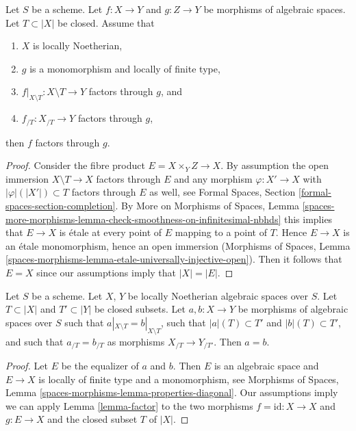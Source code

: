 \begin{lemma}
\label{lemma-factor}
Let $S$ be a scheme. Let $f : X \to Y$ and $g : Z \to Y$ be morphisms
of algebraic spaces. Let $T \subset |X|$ be closed.
Assume that
\begin{enumerate}
\item $X$ is locally Noetherian,
\item $g$ is a monomorphism and locally of finite type,
\item $f|_{X \setminus T} : X \setminus T \to Y$ factors through $g$, and
\item $f_{/T} : X_{/T} \to Y$ factors through $g$,
\end{enumerate}
then $f$ factors through $g$.
\end{lemma}

\begin{proof}
Consider the fibre product $E = X \times_Y Z \to X$.
By assumption the open immersion $X \setminus T \to X$
factors through $E$ and any morphism $\varphi : X' \to X$ with
$|\varphi|(|X'|) \subset T$ factors through $E$ as well, see
Formal Spaces, Section \ref{formal-spaces-section-completion}.
By More on Morphisms of Spaces, Lemma
\ref{spaces-more-morphisms-lemma-check-smoothness-on-infinitesimal-nbhds}
this implies that $E \to X$ is \'etale at every point of $E$
mapping to a point of $T$. Hence $E \to X$ is an \'etale
monomorphism, hence an open immersion
(Morphisms of Spaces, Lemma
\ref{spaces-morphisms-lemma-etale-universally-injective-open}).
Then it follows that $E = X$ since our assumptions imply that $|X| = |E|$.
\end{proof}

\begin{lemma}
\label{lemma-faithful}
Let $S$ be a scheme. Let $X$, $Y$ be locally Noetherian algebraic spaces
over $S$. Let $T \subset |X|$ and $T' \subset |Y|$ be closed subsets.
Let $a, b : X \to Y$ be morphisms of algebraic spaces over $S$ such
that $a|_{X \setminus T} = b|_{X \setminus T}$, such that
$|a|(T) \subset T'$ and $|b|(T) \subset T'$, and such that
$a_{/T} = b_{/T}$ as morphisms $X_{/T} \to Y_{/T'}$.
Then $a = b$.
\end{lemma}

\begin{proof}
Let $E$ be the equalizer of $a$ and $b$. Then $E$ is an algebraic space
and $E \to X$ is locally of finite type and a monomorphism, see
Morphisms of Spaces, Lemma \ref{spaces-morphisms-lemma-properties-diagonal}.
Our assumptions imply we can apply Lemma \ref{lemma-factor} to the two
morphisms $f = \text{id} : X \to X$ and $g : E \to X$ and the closed
subset $T$ of $|X|$.
\end{proof}

